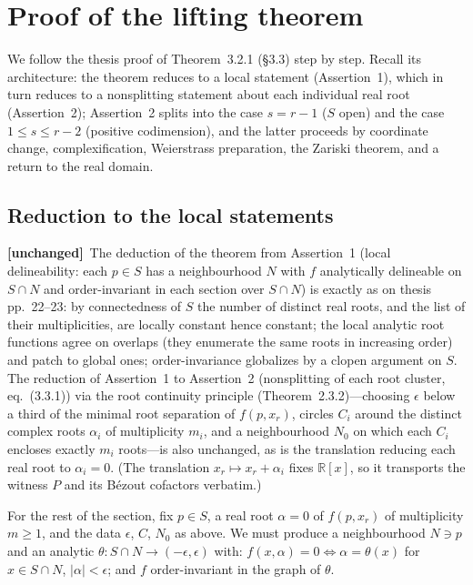 \documentclass[11pt,a4paper]{article}
\theoremstyle{plain}
\theoremstyle{definition}
\newcommand{\R}{\mathbb{R}}
\newcommand{\UNCHANGED}{\textbf{[unchanged]}}
\begin{document}
\section{Proof of the lifting theorem}\label{sec:lifting-proof}

We follow the thesis proof of Theorem~3.2.1 (\S3.3) step by step. Recall its
architecture: the theorem reduces to a local statement (Assertion~1), which in
turn reduces to a nonsplitting statement about each individual real root
(Assertion~2); Assertion~2 splits into the case $s=r-1$ ($S$ open) and the
case $1\le s\le r-2$ (positive codimension), and the latter proceeds by
coordinate change, complexification, Weierstrass preparation, the Zariski
theorem, and a return to the real domain.

\subsection{Reduction to the local statements}\label{ssec:reduce}

\UNCHANGED\ The deduction of the theorem from Assertion~1 (local
delineability: each $p\in S$ has a neighbourhood $N$ with $f$ analytically
delineable on $S\cap N$ and order-invariant in each section over $S\cap N$) is
exactly as on thesis pp.~22--23: by connectedness of $S$ the number of
distinct real roots, and the list of their multiplicities, are locally
constant hence constant; the local analytic root functions agree on overlaps
(they enumerate the same roots in increasing order) and patch to global ones;
order-invariance globalizes by a clopen argument on $S$. The reduction of
Assertion~1 to Assertion~2 (nonsplitting of each root cluster, eq.~(3.3.1))
via the root continuity principle (Theorem~2.3.2)---choosing $\epsilon$ below
a third of the minimal root separation of $f(p,x_r)$, circles $C_i$ around the
distinct complex roots $\alpha_i$ of multiplicity $m_i$, and a neighbourhood
$N_0$ on which each $C_i$ encloses exactly $m_i$ roots---is also unchanged, as
is the translation reducing each real root to $\alpha_i=0$. (The translation
$x_r\mapsto x_r+\alpha_i$ fixes $\R[x]$, so it transports the witness $P$ and
its B\'ezout cofactors verbatim.)

For the rest of the section, fix $p\in S$, a real root $\alpha=0$ of
$f(p,x_r)$ of multiplicity $m\ge 1$, and the data $\epsilon$, $C$, $N_0$ as
above. We must produce a neighbourhood $N\ni p$ and an analytic
$\theta:S\cap N\to(-\epsilon,\epsilon)$ with: $f(x,\alpha)=0\iff
\alpha=\theta(x)$ for $x\in S\cap N$, $|\alpha|<\epsilon$; and $f$
order-invariant in the graph of $\theta$.
\end{document}
